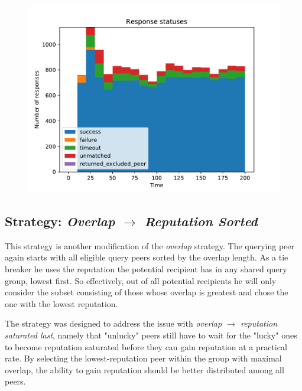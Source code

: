 \begin{figure}[t]
\centering
\includegraphics[width=1\columnwidth]{figures/selection_overlap_high_rep_last_resp_statuses}
\label{fig:selection_overlap_high_rep_last_resp_statuses}
\end{figure}

\subsection{Strategy: \emph{Overlap $\rightarrow$ Reputation Sorted}}
\label{sec:rep_avail_selection_overlap_rep_sorted}
This strategy is another modification of the \emph{overlap} strategy. The
querying peer again starts with all eligible query peers sorted by the overlap
length. As a tie breaker he uses the reputation the potential recipient has in
any shared query group, lowest first. So effectively, out of all potential
recipients he will only consider the subset consisting of those whose overlap is
greatest and chose the one with the lowest reputation.

The strategy was designed to address the issue with \emph{overlap $\rightarrow$
reputation saturated last}, namely that "unlucky" peers still have to wait for
the "lucky" ones to become reputation saturated before they can gain reputation
at a practical rate. By selecting the lowest-reputation peer within the group
with maximal overlap, the ability to gain reputation should be better
distributed among all peers.

